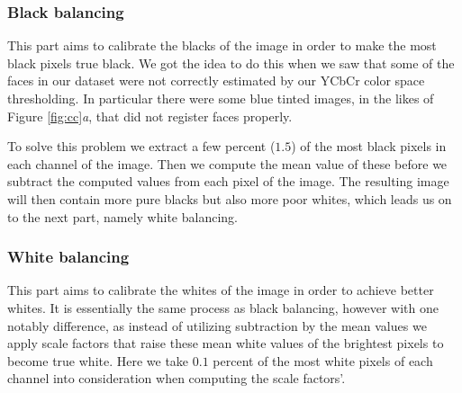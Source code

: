 \subsubsection{Black balancing}
This part aims to calibrate the blacks of the image in order to make the most black pixels true black. We got the idea to do this when we saw that some of the faces in our dataset were not correctly estimated by our YCbCr color space thresholding. In particular there were some blue tinted images, in the likes of  Figure \ref{fig:cc}\textit{a}, that did not register faces properly. 

To solve this problem we extract a few percent ($1.5$) of the most black pixels in each channel of the image. Then we compute the mean value of these before we subtract the computed values from each pixel of the image. The resulting image will then contain more pure blacks but also more poor whites, which leads us on to the next part, namely white balancing.


\subsubsection{White balancing}
This part aims to calibrate the whites of the image in order to achieve better whites. It is essentially the same process as black balancing, however with one notably difference, as instead of utilizing subtraction by the mean values we apply scale factors that raise these mean white values of the brightest pixels to become true white. Here we take $0.1$ percent of the most white pixels of each channel into consideration when computing the scale factors'.



